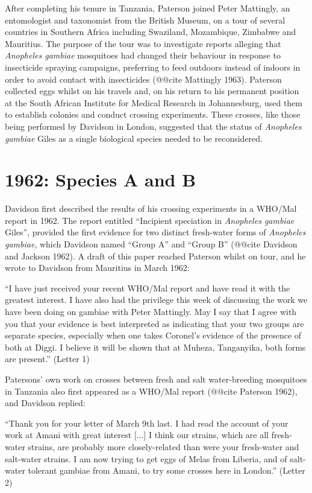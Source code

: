 \documentclass[a4paper,11pt,abstracton,hidelinks]{scrartcl}
\begin{document}
After completing his tenure in Tanzania, Paterson joined Peter Mattingly, an entomologist and taxonomist from the British Museum, on a tour of several countries in Southern Africa including Swaziland, Mozambique, Zimbabwe and Mauritius.
%
The purpose of the tour was to investigate reports alleging that \textit{Anopheles gambiae} mosquitoes had changed their behaviour in response to insecticide spraying campaigns, preferring to feed outdoors instead of indoors in order to avoid contact with insecticides (@@cite Mattingly 1963).
%
Paterson collected eggs whilst on his travels and, on his return to his permanent position at the South African Institute for Medical Research in Johannesburg, used them to establish colonies and conduct crossing experiments.
%
These crosses, like those being performed by Davidson in London, suggested that the status of \textit{Anopheles gambiae} Giles as a single biological species needed to be reconsidered.


\section{1962: Species A and B}

Davidson first described the results of his crossing experiments in a WHO/Mal report in 1962.
%
The report entitled ``Incipient speciation in \textit{Anopheles gambiae} Giles'', 
provided the first evidence for two distinct fresh-water forms of \textit{Anopheles gambiae}, which Davidson named ``Group A'' and ``Group B'' (@@cite Davidson and Jackson 1962).
%
A draft of this paper reached Paterson whilst on tour, and he wrote to Davidson from Mauritius in March 1962:
%
\begin{displayquote}
``I have just received your recent WHO/Mal report and have read it with the greatest interest.
%
I have also had the privilege this week of discussing the work we have been doing on gambiae with Peter Mattingly.
%
May I say that I agree with you that your evidence is best interpreted as indicating that your two groups are separate species, especially when one takes Coronel's evidence of the presence of both at Diggi.
%
I believe it will be shown that at Muheza, Tanganyika, both forms are present.'' (Letter 1)
\end{displayquote}


Patersons' own work on crosses between fresh and salt water-breeding mosquitoes in Tanzania also first appeared as a WHO/Mal report (@@cite Paterson 1962), and Davidson replied:
%
\begin{displayquote}
``Thank you for your letter of March 9th last. 
%
I had read the account of your work at Amani with great interest [...] I think our strains, which are all fresh-water strains, are probably more closely-related than were your fresh-water and salt-water strains.
%
I am now trying to get eggs of Melas from Liberia, and of salt-water tolerant gambiae from Amani, to try some crosses here in London.'' (Letter 2)
\end{displayquote}
\end{document}
